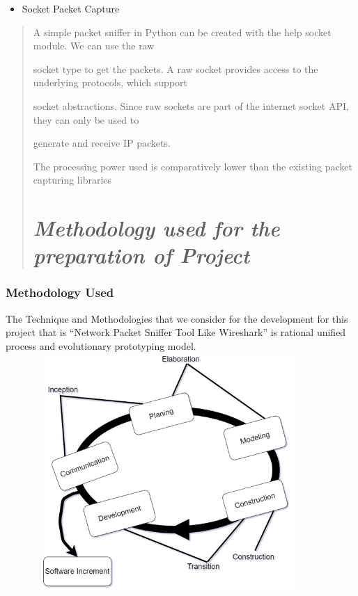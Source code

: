\documentclass[12pt, a4paper]{report}
\begin{document}
\begin{itemize}
\item
  Socket Packet Capture
\end{itemize}

\begin{quote}
A simple packet sniffer in Python can be created with the help socket
module. We can use the raw

socket type to get the packets. A raw socket provides access to the
underlying protocols, which support

socket abstractions. Since raw sockets are part of the internet socket
API, they can only be used to

generate and receive IP packets.

The processing power used is comparatively lower than the existing
packet capturing libraries

\chapter{\emph{Methodology used for the preparation of Project }}
\end{quote}

\subsection{Methodology Used}

The Technique and Methodologies that we consider for the development for this project that is ``Network Packet Sniffer Tool Like Wireshark'' is rational unified process and evolutionary prototyping model. \\

\includegraphics[width=4.85666in,height=3.55507in]{image9.png}
\end{document}
